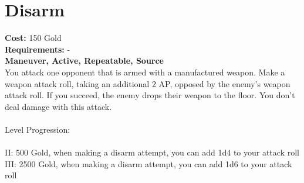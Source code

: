 \section{Disarm}
\textbf{Cost:} 150 Gold\\
\textbf{Requirements:} -\\
\textbf{Maneuver, Active, Repeatable, Source}\\
You attack one opponent that is armed with a manufactured weapon. Make a weapon attack roll, taking an additional 2 AP, opposed by the enemy's weapon attack roll. If you succeed, the enemy drops their weapon to the floor. You don't deal damage with this attack.\\
\\
Level Progression:\\
\\
II: 500 Gold, when making a disarm attempt, you can add 1d4 to your attack roll\\ 
III: 2500 Gold, when making a disarm attempt, you can add 1d6 to your attack roll\\